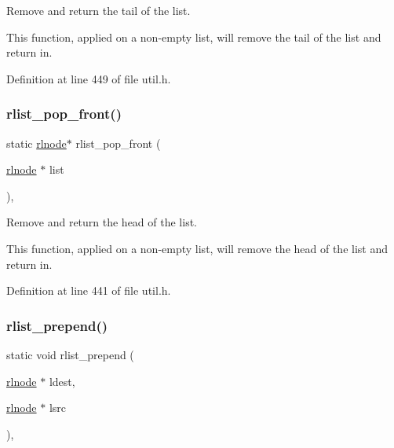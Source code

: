 Remove and return the tail of the list. 

This function, applied on a non-\/empty list, will remove the tail of the list and return in. 

Definition at line 449 of file util.\+h.

\mbox{\label{group__rlists_ga5cc2be48f94a7573fb8952356c6ba7d1}} 
\subsubsection{\texorpdfstring{rlist\+\_\+pop\+\_\+front()}{rlist\_pop\_front()}}
{\footnotesize\ttfamily static \hyperlink{group__rlists_ga8f6244877f7ce2322c90525217ea6e7a}{rlnode}$\ast$ rlist\+\_\+pop\+\_\+front (\begin{DoxyParamCaption}\item[{\hyperlink{group__rlists_ga8f6244877f7ce2322c90525217ea6e7a}{rlnode} $\ast$}]{list }\end{DoxyParamCaption})\hspace{0.3cm}{\ttfamily [inline]}, {\ttfamily [static]}}



Remove and return the head of the list. 

This function, applied on a non-\/empty list, will remove the head of the list and return in. 

Definition at line 441 of file util.\+h.

\mbox{\label{group__rlists_ga906dea2f5a25116f979ba6585266453e}} 
\subsubsection{\texorpdfstring{rlist\+\_\+prepend()}{rlist\_prepend()}}
{\footnotesize\ttfamily static void rlist\+\_\+prepend (\begin{DoxyParamCaption}\item[{\hyperlink{group__rlists_ga8f6244877f7ce2322c90525217ea6e7a}{rlnode} $\ast$}]{ldest,  }\item[{\hyperlink{group__rlists_ga8f6244877f7ce2322c90525217ea6e7a}{rlnode} $\ast$}]{lsrc }\end{DoxyParamCaption})\hspace{0.3cm}{\ttfamily [inline]}, {\ttfamily [static]}}



